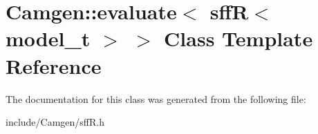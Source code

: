 \hypertarget{a00192}{\section{Camgen\-:\-:evaluate$<$ sff\-R$<$ model\-\_\-t $>$ $>$ Class Template Reference}
\label{a00192}
}


The documentation for this class was generated from the following file\-:\begin{DoxyCompactItemize}
\item 
include/\-Camgen/sff\-R.\-h\end{DoxyCompactItemize}
